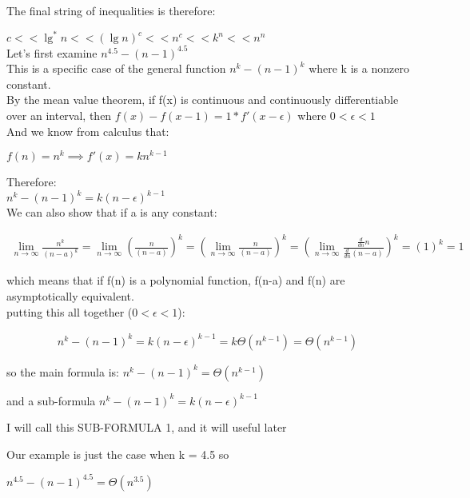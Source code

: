 \documentclass[11pt,fleqn]{article}
\theoremstyle{definition}
\theoremstyle{remark}
\begin{document}
The final string of inequalities is therefore:

$c << \lg^*n << ({\lg n})^c << n^{c} << k^{n} << n^n$\\

Let's first examine $n^{4.5} - (n - 1)^{4.5}$\\

This is a specific case of the general function $n^{k} - (n - 1)^{k}$
where k is a nonzero constant.\\

By the mean value theorem, if f(x) is continuous and 
continuously differentiable over an interval, then 
$f(x) - f(x - 1) = 1 * f'(x - \epsilon)$ where $0 < \epsilon < 1$\\

And we know from calculus that:

$f(n) = n^{k} \implies f'(x) = kn^{k-1}$

Therefore:\\ 

$n^{k} - (n - 1)^{k} = k(n - \epsilon)^{k-1}$\\

We can also show that if a is any constant: 

\begin{align*}
\lim_{n \to \infty} \frac{n^{k}}{(n-a)^{k}} = 
\lim_{n \to \infty} (\frac{n}{(n-a)})^{k} = 
(\lim_{n \to \infty} \frac{n}{(n-a)})^{k} = 
(\lim_{n \to \infty} \frac{\frac{d}{dn}n}{\frac{d}{dn}(n-a)})^{k} = 
(1)^{k} = 
1
\end{align*}

which means that if f(n) is a polynomial function, f(n-a) and f(n)
are asymptotically equivalent.\\

putting this all together ($0 < \epsilon < 1$):

\begin{align*}
n^{k} - (n - 1)^{k} = 
k(n-\epsilon)^{k - 1} =
k\Theta(n^{k - 1}) = 
\Theta(n^{k - 1})
\end{align*}

so the main formula is: $n^{k} - (n - 1)^{k} = \Theta(n^{k - 1})$

and a sub-formula $n^{k} - (n - 1)^{k} = k(n-\epsilon)^{k - 1}$

I will call this SUB-FORMULA 1, and it will useful later

Our example is just the case when k = 4.5 so

$n^{4.5} - (n - 1)^{4.5} = \Theta(n^{3.5})$
\end{document}
